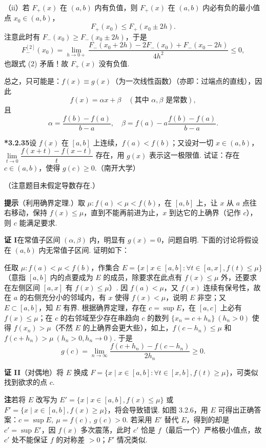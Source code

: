 \documentclass[UTF8, 12pt, fontset=fandol, oneside]{ctexart}
\begin{document}
（ii）若 $F_+(x)$ 在 $(a,b)$ 内有负值，则 $F_+(x)$ 在 $(a,b)$ 内必有负的最小值点 $x_0\in(a,b)$，
\[
  F_+(x_0)\le F_+(x_0\pm2h).
\]
注意此时有 $F_-(x_0)\ge F_-(x_0\pm2h)$，于是
\[
  F_-^{[2]}(x_0)
  =
  \lim_{h\to0+}
  \frac{F_-(x_0+2h)-2F_-(x_0)+F_-(x_0-2h)}{4h^2}
  \le0,
\]
也跟式 (2) 矛盾！故 $F_+(x)$ 没有负值.

总之，只可能是：$f(x)\equiv g(x)$（为一次线性函数）（亦即：过端点的直线），因此
\[
  f(x)=\alpha x+\beta\quad(\text{其中 }\alpha,\beta\text{ 是常数}),
\]
且
\[
  \alpha=\frac{f(b)-f(a)}{b-a},\quad
  \beta=f(a)-a\frac{f(b)-f(a)}{b-a}.
\]

\noindent\textbf{*3.2.35}\quad 设 $f(x)$ 在 $[a,b]$ 上连续，$f(a)<f(b)$；又设对一切 $x\in(a,b)$，$\lim\limits_{t\to0}\dfrac{f(x+t)-f(x-t)}t$ 存在，用 $g(x)$ 表示这一极限值. 试证：存在 $c\in(a,b)$，使得 $g(c)\ge0$.（南开大学）

（注意题目未假定导数存在.）

\noindent\textbf{提示}\quad （利用确界定理.）取 $\mu:f(a)<\mu<f(b)$，在 $[a,b]$ 上，让 $x$ 从 $a$ 点往右移动，保持 $f(x)\le\mu$，直到不能再前进为止，$x$ 到达它的上确界（记作 $c$），则 $c$ 能满足要求.

\noindent\textbf{证 I}\quad 在常值子区间 $(\alpha,\beta)$ 内，明显有 $g(x)=0$，问题自明. 下面的讨论将假设在 $(a,b)$ 内无常值子区间. 证明如下：

任取 $\mu:f(a)<\mu<f(b)$，作集合 $E=\{x\mid x\in[a,b]:\forall t\in[a,x],f(t)\le\mu\}$（意指 $[a,b]$ 内的点要成为 $E$ 的成员，除要求在此点有 $f(x)\le\mu$ 外，还要求在左侧区间 $[a,x]$ 有 $f(x)\le\mu$）. 因 $f(a)<\mu$，又 $f(x)$ 连续有保号性，故在 $a$ 的右侧充分小的邻域内，有 $x$ 使得 $f(x)<\mu$，说明 $E$ 非空；又 $E\subset[a,b]$，知 $E$ 有界. 根据确界定理，存在 $c=\sup E$，在 $[a,c]$ 上必有 $f(x)\le\mu$；在 $c$ 的右邻域至少存在串趋向 $c$ 的数列 $\{x_n=c+h_n\}\ (h_n>0)$ 使得 $f(x_n)>\mu$（不然 $E$ 的上确界会更大些），如上，$f(c-h_n)\le\mu$ 和 $f(c+h_n)>\mu\ (h_n>0,h_n\to0)$. 于是
\[
  g(c)=\lim_{n\to\infty}\frac{f(c+h_n)-f(c-h_n)}{2h_n}\ge0.
\]

\noindent\textbf{证 II}\quad （对偶地）将 $E$ 换成 $F=\{x\mid x\in[a,b]:\forall t\in[x,b],f(t)\ge\mu\}$，可类似找到欲求的点 $c$.

\noindent\textbf{注}\quad 若将 $E$ 改写为 $E'=\{x\mid x\in[a,b],f(x)\le\mu\}$ 或 $F'=\{x\mid x\in[a,b],f(x)\ge\mu\}$，将会导致错误. 如图 3.2.6，用 $E$ 可得出正确答案：$c=\sup E,\ \mu=f(c),\ g(c)>0$. 若采用 $E'$ 替代 $E$，得到的却是 $c'=\sup E'$，因 $f(x)$ 多次震荡，此时 $c'$ 恰是 $f$（最后一个）严格极小值点，故 $c'$ 处不能保证 $f$ 的对称差 $>0$；$F'$ 情况类似.
\end{document}
